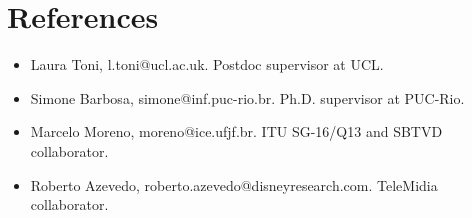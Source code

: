 \documentclass[10pt,a4paper,sans,colorlinks]{moderncv}
\begin{document}
\section{References}

\begin{itemize}
  \item Laura Toni, l.toni@ucl.ac.uk. Postdoc supervisor at UCL.
  \item Simone Barbosa, simone@inf.puc-rio.br. Ph.D. supervisor at PUC-Rio.
  \item Marcelo Moreno, moreno@ice.ufjf.br. ITU SG-16/Q13 and SBTVD collaborator.
  \item Roberto Azevedo, roberto.azevedo@disneyresearch.com. TeleMidia collaborator.
\end{itemize}
\end{document}
